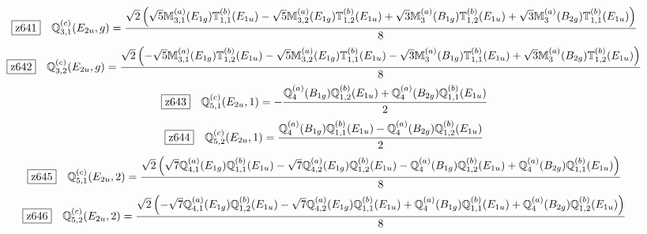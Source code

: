 \documentclass[fleqn,10pt,landscape]{jsarticle}
\begin{document}
\begin{dmath*}
\hspace*{3mm}\fbox{z641}\quad \mathbb{Q}_{3,1}^{(c)}(E_{2u},g)=\frac{\sqrt{2} \left(\sqrt{5} \mathbb{M}_{3,1}^{(a)}(E_{1g}) \mathbb{T}_{1,1}^{(b)}(E_{1u}) - \sqrt{5} \mathbb{M}_{3,2}^{(a)}(E_{1g}) \mathbb{T}_{1,2}^{(b)}(E_{1u}) + \sqrt{3} \mathbb{M}_{3}^{(a)}(B_{1g}) \mathbb{T}_{1,2}^{(b)}(E_{1u}) + \sqrt{3} \mathbb{M}_{3}^{(a)}(B_{2g}) \mathbb{T}_{1,1}^{(b)}(E_{1u})\right)}{8}
\end{dmath*}
\begin{dmath*}
\hspace*{3mm}\fbox{z642}\quad \mathbb{Q}_{3,2}^{(c)}(E_{2u},g)=\frac{\sqrt{2} \left(- \sqrt{5} \mathbb{M}_{3,1}^{(a)}(E_{1g}) \mathbb{T}_{1,2}^{(b)}(E_{1u}) - \sqrt{5} \mathbb{M}_{3,2}^{(a)}(E_{1g}) \mathbb{T}_{1,1}^{(b)}(E_{1u}) - \sqrt{3} \mathbb{M}_{3}^{(a)}(B_{1g}) \mathbb{T}_{1,1}^{(b)}(E_{1u}) + \sqrt{3} \mathbb{M}_{3}^{(a)}(B_{2g}) \mathbb{T}_{1,2}^{(b)}(E_{1u})\right)}{8}
\end{dmath*}
\begin{dmath*}
\hspace*{3mm}\fbox{z643}\quad \mathbb{Q}_{5,1}^{(c)}(E_{2u},1)=- \frac{\mathbb{Q}_{4}^{(a)}(B_{1g}) \mathbb{Q}_{1,2}^{(b)}(E_{1u}) + \mathbb{Q}_{4}^{(a)}(B_{2g}) \mathbb{Q}_{1,1}^{(b)}(E_{1u})}{2}
\end{dmath*}
\begin{dmath*}
\hspace*{3mm}\fbox{z644}\quad \mathbb{Q}_{5,2}^{(c)}(E_{2u},1)=\frac{\mathbb{Q}_{4}^{(a)}(B_{1g}) \mathbb{Q}_{1,1}^{(b)}(E_{1u}) - \mathbb{Q}_{4}^{(a)}(B_{2g}) \mathbb{Q}_{1,2}^{(b)}(E_{1u})}{2}
\end{dmath*}
\begin{dmath*}
\hspace*{3mm}\fbox{z645}\quad \mathbb{Q}_{5,1}^{(c)}(E_{2u},2)=\frac{\sqrt{2} \left(\sqrt{7} \mathbb{Q}_{4,1}^{(a)}(E_{1g}) \mathbb{Q}_{1,1}^{(b)}(E_{1u}) - \sqrt{7} \mathbb{Q}_{4,2}^{(a)}(E_{1g}) \mathbb{Q}_{1,2}^{(b)}(E_{1u}) - \mathbb{Q}_{4}^{(a)}(B_{1g}) \mathbb{Q}_{1,2}^{(b)}(E_{1u}) + \mathbb{Q}_{4}^{(a)}(B_{2g}) \mathbb{Q}_{1,1}^{(b)}(E_{1u})\right)}{8}
\end{dmath*}
\begin{dmath*}
\hspace*{3mm}\fbox{z646}\quad \mathbb{Q}_{5,2}^{(c)}(E_{2u},2)=\frac{\sqrt{2} \left(- \sqrt{7} \mathbb{Q}_{4,1}^{(a)}(E_{1g}) \mathbb{Q}_{1,2}^{(b)}(E_{1u}) - \sqrt{7} \mathbb{Q}_{4,2}^{(a)}(E_{1g}) \mathbb{Q}_{1,1}^{(b)}(E_{1u}) + \mathbb{Q}_{4}^{(a)}(B_{1g}) \mathbb{Q}_{1,1}^{(b)}(E_{1u}) + \mathbb{Q}_{4}^{(a)}(B_{2g}) \mathbb{Q}_{1,2}^{(b)}(E_{1u})\right)}{8}
\end{dmath*}
\end{document}
